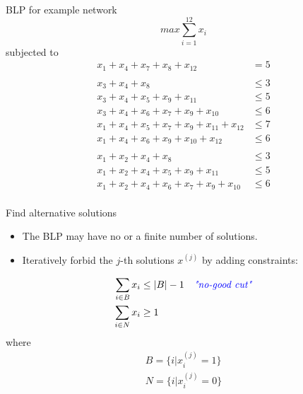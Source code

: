 \documentclass{beamer}
\begin{document}
\begin{frame}{BLP for example network}
\small
$$max \sum_{i=1}^{12} x_i$$
subjected to  
\begin{align*}
    x_1 + x_4 + x_7 + x_8 + x_{12}                      & = 5   \\
    \\
    x_3 + x_4 + x_8                                     & \leq 3 \\
    x_3 + x_4 + x_5 + x_9 + x_{11}                      & \leq 5 \\
    x_3 + x_4 + x_6 + x_7 + x_9 + x_{10}                & \leq 6 \\
    x_1 + x_4 + x_5 + x_7 + x_9 + x_{11} + x_{12}       & \leq 7 \\
    x_1 + x_4 + x_6 + x_9 + x_{10} + x_{12}             & \leq 6 \\
    \\
    x_1 + x_2 + x_4 + x_8                               & \leq 3 \\
    x_1 + x_2 + x_4 + x_5 + x_9 + x_{11}                & \leq 5 \\
    x_1 + x_2 + x_4 + x_6 + x_7 + x_9 + x_{10}          & \leq 6 \\
    \end{align*}
\end{frame}


\begin{frame}{Find alternative solutions}
\begin{itemize}
    \item The BLP may have no or a finite number of solutions.
    \item Iteratively forbid the $j$-th solutions $x^{(j)}$ by adding constraints:
\end{itemize}
    
    \begin{align*}
        \sum_{i \in B} x_i & \leq |B| -1 & 
        \text{\emph{\textcolor{blue}{"no-good cut"}}}\\
        \sum_{i \in N} x_i & \geq 1   & ~\\
    \end{align*}
    where 
    \begin{align*}
        B = \{i |x_{i}^{(j)} = 1\} \\
        N = \{i |x_{i}^{(j)} = 0\} \\
    \end{align*}

\end{frame}
\end{document}
